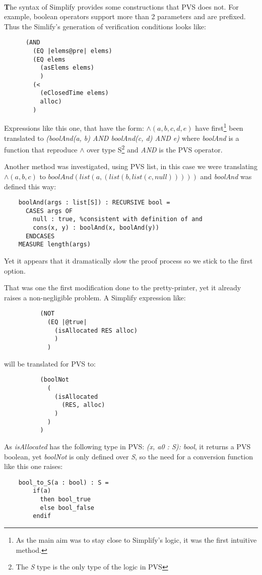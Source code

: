 \documentclass[english,a4paper,10pt]{article}
\newcommand{\superParachute}[1]{\paragraph{}\textbf{#1}}
\newcommand{\BalleSousLeLit}[2]{
\bigskip
\bigskip
\begin{Large}\textbf{\begin{LARGE}#1\end{LARGE}#2}\end{Large}
}
\begin{document}
\BalleSousLeLit{I}{ssues about writing the translation}

\superParachute{T}he syntax of Simplify provides some constructions
that PVS does not. For example, boolean operators support more than 2
parameters and are prefixed. Thus the Simlify's generation of
verification conditions looks like:
\begin{verbatim}
      (AND 
        (EQ |elems@pre| elems)
        (EQ elems 
          (asElems elems)
          )
        (< 
          (eClosedTime elems)
          alloc)
        )
\end{verbatim}
Expressions like this one, that have the form:
$\wedge(a, b, c, d, e)$ have first\footnote{As the main aim was to
  stay close to Simplify's logic, it was the first intuitive method.}
been translated to \textit{(boolAnd(a, b) AND boolAnd(c, d) AND e)}
where \textit{boolAnd} is a function that reproduce $\wedge$ over type
S\footnote{The \textit{S} type is the only type of the logic in PVS}
and \textit{AND} is the PVS operator. 

Another method was investigated, using PVS list, in this case we were
translating $\wedge(a, b, c)$ to 
$boolAnd(list(a, (list (b, list (c, null)))))$ 
and \textit{boolAnd} was defined this way:
\begin{verbatim}
    boolAnd(args : list[S]) : RECURSIVE bool = 
      CASES args OF
        null : true, %consistent with definition of and
        cons(x, y) : boolAnd(x, boolAnd(y))
      ENDCASES
    MEASURE length(args)
\end{verbatim}
Yet it appears that it dramatically slow the proof process so we stick
to the first option.

That was one the first modification done to the pretty-printer, yet it
already raises a non-negligible problem.  A Simplify expression like:
\begin{verbatim}
          (NOT 
            (EQ |@true| 
              (isAllocated RES alloc)
              )
            )
\end{verbatim}
will be translated for PVS to:
\begin{verbatim}
          (boolNot
            (
              (isAllocated
                (RES, alloc)
              )
            )
          )  
\end{verbatim}
As \textit{isAllocated} has the following type in PVS: \textit{(x, a0
  : S): bool}, it returns a PVS boolean, yet \textit{boolNot} is only
defined over \textit{S}, so the need for a conversion function like
this one raises:
\begin{verbatim}
    bool_to_S(a : bool) : S = 
        if(a) 
          then bool_true 
          else bool_false
        endif 
\end{verbatim}
\end{document}
